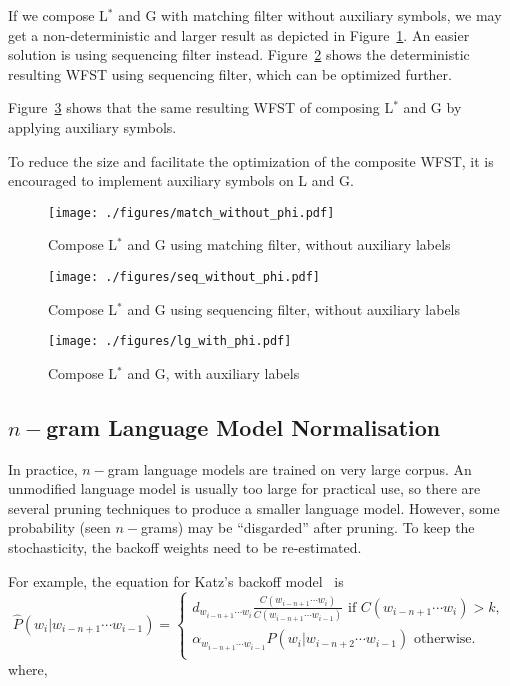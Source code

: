 If we compose L$^{*}$ and G with matching filter without auxiliary symbols, we may get a non-deterministic and larger result as depicted in Figure~\ref{non-deterministic-LG}. An easier solution is using sequencing filter instead. Figure~\ref{deterministic-LG} shows the deterministic resulting WFST using sequencing filter, which can be optimized further.

Figure~\ref{lg_aux} shows that the same resulting WFST of composing L$^{*}$ and G by applying auxiliary symbols.

To reduce the size and facilitate the optimization of the composite WFST, it is encouraged to implement auxiliary symbols on L and G.

\begin{figure}[H]
  \centering
  \texttt{[image: ./figures/match\_without\_phi.pdf]}
  \caption{Compose L$^{*}$ and G using matching filter, without auxiliary labels}
  \label{non-deterministic-LG}
\end{figure}

\begin{figure}[H]
  \centering
  \texttt{[image: ./figures/seq\_without\_phi.pdf]}
  \caption{Compose L$^{*}$ and G using sequencing filter, without auxiliary labels}
  \label{deterministic-LG}
\end{figure}

\begin{figure}[H]
  \centering
  \texttt{[image: ./figures/lg\_with\_phi.pdf]}
  \caption{Compose L$^{*}$ and G, with auxiliary labels}
  \label{lg_aux}
\end{figure}


\subsection{$n-$gram Language Model Normalisation}
\label{subsubsec:grmnorm}
In practice, $n-$gram language models are trained on very large corpus. An unmodified language model is usually too large for practical use, so there are several pruning techniques to produce a smaller language model. However, some probability (seen $n-$grams) may be ``disgarded'' after pruning. To keep the stochasticity, the backoff weights need to be re-estimated. 

For example, the equation for Katz's backoff model~\cite{katz1987estimation} is
$$
\hat{P}(w_{i}|w_{i-n+1}\cdots{}w_{i-1}) = \left\{
\begin{aligned}
d_{w_{i-n+1}\cdots{}w_{i}}\frac{C(w_{i-n+1}\cdots{}w_{i})}{C(w_{i-n+1}\cdots{}w_{i-1})} \mbox{ if } C(w_{i-n+1}\cdots{}w_{i}) > k,\\
\alpha_{w_{i-n+1}\cdots{}w_{i-1}}\hat{P}(w_{i}|w_{i-n+2}\cdots{}w_{i-1}) \mbox{ otherwise.}\\
\end{aligned}
\right.
$$
where,

